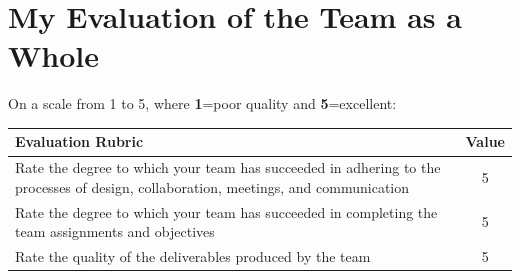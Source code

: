 \documentclass[12pt,a4paper]{article}
\begin{document}
\section{My Evaluation of the Team as a Whole} 
On a scale from 1 to 5, where \textbf{1}=poor quality and \textbf{5}=excellent:

\begin{table}[htp]
\footnotesize
\centering
\begin{tabulary}{\linewidth}{|L|c|}
\hline
{}Evaluation Rubric & Value \\
\hline
Rate the degree to which your team has succeeded in adhering to the processes of design, collaboration, meetings, and communication & 5 \\ %
\hline
Rate the degree to which your team has succeeded in completing the
team assignments and objectives & 5 \\ %
\hline
Rate the quality of the deliverables produced by the team & 5 \\ %
\hline
\end{tabulary}
\label{tab:team1}
\end{table}%
\end{document}
